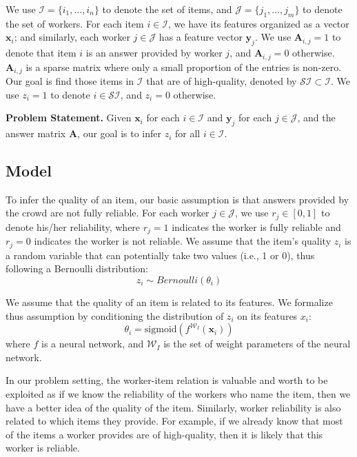 \documentclass{article}
\begin{document}
We use $\mathcal{I} = \{i_1, \ldots, i_n\}$ to denote the set of items, and  $\mathcal{J} = \{j_1, \ldots, j_m \}$ to denote the set of workers. For each item $i \in \mathcal{I}$, we have its features organized as a vector $\mathbf{x}_i$; and similarly, each worker $j \in \mathcal{J}$ has a feature vector $\mathbf{y}_j$. We use $\mathbf{A}_{i,j}=1$ to denote that item $i$ is an answer provided by worker $j$, and $\mathbf{A}_{i,j}=0$ otherwise. $\mathbf{A}_{i,j}$ is a sparse matrix where only a small proportion of the entries is non-zero. Our goal is find those items in $\mathcal{I}$ that are of high-quality, denoted by $\mathcal{SI} \subset \mathcal{I}$. We use $z_i = 1$ to denote $i\in \mathcal{SI}$, and $z_i = 0$ otherwise.

\smallskip
\noindent\textbf{Problem Statement.} Given $\mathbf{x}_i$ for each $i\in \mathcal{I}$ and $\mathbf{y}_j$ for each $j\in \mathcal{J}$, and the answer matrix $\mathbf{A}$, our goal is to infer $z_i$ for all $i\in \mathcal{I}$.
\subsection{Model}
To infer the quality of an item, our basic assumption is that answers provided by the crowd are not fully reliable. For each worker $j\in \mathcal{J}$, we use $r_j \in [0,1]$ to denote his/her reliability, where $r_j=1$ indicates the worker is fully reliable and $r_j=0$ indicates the worker is not reliable.
We assume that the item's quality $z_i$ is a random variable that can potentially take two values (i.e., 1 or 0), thus following a Bernoulli distribution:
\begin{equation}
    z_i \sim Bernoulli(\theta_i)
\end{equation}

We assume that the quality of an item is related to its features. We formalize thus assumption by conditioning the distribution of $z_i$ on its features $x_i$:
\begin{equation}
    \theta_i  = \text{sigmoid} (f^{\mathcal{W}_I}(\mathbf{x}_i))
\end{equation}
where $f$ is a neural network, and $\mathcal{W}_I$ is the set of weight parameters of the neural network.

In our problem setting, the worker-item relation is valuable and worth to be exploited as if we know the reliability of the workers who name the item, then we have a better idea of the quality of the item. Similarly, worker reliability
is also related to which items they provide. For example, if we already know that most of the items a worker provides are of high-quality, then it is likely that this worker is reliable. 
\end{document}
